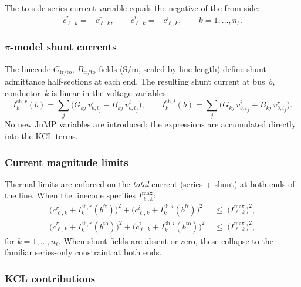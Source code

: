 \documentclass[11pt,a4paper]{article}
\begin{document}
The to-side series current variable equals the negative of the from-side:
%
\begin{equation}
  \tilde{c}^r_{\ell,k} = -c^r_{\ell,k},\qquad
  \tilde{c}^i_{\ell,k} = -c^i_{\ell,k},\qquad
  k = 1,\ldots,n_\ell.
\end{equation}

\subsubsection*{$\pi$-model shunt currents}

The linecode $G_\text{fr/to}$, $B_\text{fr/to}$ fields (S/m, scaled by line
length) define shunt admittance half-sections at each end.  The resulting shunt
current at bus~$b$, conductor~$k$ is linear in the voltage variables:
%
\begin{equation}
  I^{\text{sh},r}_{k}(b)
  = \sum_j \bigl(G_{kj}\,v^r_{b,t_j} - B_{kj}\,v^i_{b,t_j}\bigr),\qquad
  I^{\text{sh},i}_{k}(b)
  = \sum_j \bigl(G_{kj}\,v^i_{b,t_j} + B_{kj}\,v^r_{b,t_j}\bigr).
  \label{eq:ish}
\end{equation}
%
No new JuMP variables are introduced; the expressions are accumulated directly
into the KCL terms.

\subsubsection*{Current magnitude limits}

Thermal limits are enforced on the \emph{total} current (series + shunt) at
both ends of the line.  When the linecode specifies $I^\text{max}_{\ell,k}$:
%
\begin{align}
  \bigl(c^r_{\ell,k} + I^{\text{sh},r}_k(b^\text{fr})\bigr)^2
  + \bigl(c^i_{\ell,k} + I^{\text{sh},i}_k(b^\text{fr})\bigr)^2
  &\;\leq\; \bigl(I^\text{max}_{\ell,k}\bigr)^2,
  \label{eq:i-lim-fr} \\[4pt]
  \bigl(\tilde{c}^r_{\ell,k} + I^{\text{sh},r}_k(b^\text{to})\bigr)^2
  + \bigl(\tilde{c}^i_{\ell,k} + I^{\text{sh},i}_k(b^\text{to})\bigr)^2
  &\;\leq\; \bigl(I^\text{max}_{\ell,k}\bigr)^2,
  \label{eq:i-lim-to}
\end{align}
%
for $k = 1,\ldots,n_\ell$.  When shunt fields are absent or zero, these
collapse to the familiar series-only constraint at both ends.

\subsubsection*{KCL contributions}
\end{document}

